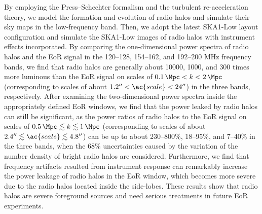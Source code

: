 \begin{englishabstract}
By employing the Press--Schechter formalism and the turbulent
re-acceleration theory, we model the formation and evolution of
radio halos and simulate their sky maps in the low-frequency band.
Then, we adopt the latest SKA1-Low layout configuration and simulate
the SKA1-Low images of radio halos with instrument effects incorporated.
By comparing the one-dimensional power spectra of radio halos and
the EoR signal in the \numrange{120}{128}, \numrange{154}{162},
and \numrange{192}{200} \si{\MHz} frequency bands, we find that
radio halos are generally about \num{10000}, 1000, and 300
times more luminous than the EoR signal on scales of
$\SI{0.1}{\per\Mpc} < k < \SI{2}{\per\Mpc}$
(corresponding to scales of about
$\SI{1.2}{\arcsecond} < \ac{scale} < \SI{24}{\arcsecond}$)
in the three bands, respectively.
After examining the two-dimensional power spectra inside the
appropriately defined EoR windows, we find that the power leaked by
radio halos can still be significant, as the power ratios of radio halos
to the EoR signal on scales of
$\SI{0.5}{\per\Mpc} \lesssim k \lesssim \SI{1}{\per\Mpc}$
(corresponding to scales of about
$\SI{2.4}{\arcsecond} \lesssim \ac{scale} \lesssim \SI{4.8}{\arcsecond}$)
can be up to about
\numrange{230}{800}\%, \numrange{18}{95}\%, and \numrange{7}{40}\%
in the three bands, when the 68\% uncertainties caused by the variation
of the number density of bright radio halos are considered.
Furthermore, we find that frequency artifacts resulted from instrument
response can remarkably increase the power leakage of radio halos in
the EoR window, which becomes more severe due to the radio halos
located inside the side-lobes.
These results show that radio halos are severe foreground sources
and need serious treatments in future EoR experiments.


\end{englishabstract}
